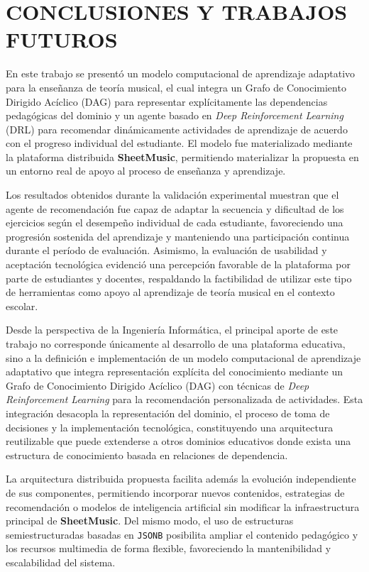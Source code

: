 \documentclass[conference]{IEEEtran}
\begin{document}
\section{CONCLUSIONES Y TRABAJOS FUTUROS}

En este trabajo se presentó un modelo computacional de aprendizaje adaptativo para la enseñanza de teoría musical, el cual integra un Grafo de Conocimiento Dirigido Acíclico (DAG) para representar explícitamente las dependencias pedagógicas del dominio y un agente basado en \textit{Deep Reinforcement Learning} (DRL) para recomendar dinámicamente actividades de aprendizaje de acuerdo con el progreso individual del estudiante. El modelo fue materializado mediante la plataforma distribuida \textbf{SheetMusic}, permitiendo materializar la propuesta en un entorno real de apoyo al proceso de enseñanza y aprendizaje.

Los resultados obtenidos durante la validación experimental muestran que el agente de recomendación fue capaz de adaptar la secuencia y dificultad de los ejercicios según el desempeño individual de cada estudiante, favoreciendo una progresión sostenida del aprendizaje y manteniendo una participación continua durante el período de evaluación. Asimismo, la evaluación de usabilidad y aceptación tecnológica evidenció una percepción favorable de la plataforma por parte de estudiantes y docentes, respaldando la factibilidad de utilizar este tipo de herramientas como apoyo al aprendizaje de teoría musical en el contexto escolar.

Desde la perspectiva de la Ingeniería Informática, el principal aporte de este trabajo no corresponde únicamente al desarrollo de una plataforma educativa, sino a la definición e implementación de un modelo computacional de aprendizaje adaptativo que integra representación explícita del conocimiento mediante un Grafo de Conocimiento Dirigido Acíclico (DAG) con técnicas de \textit{Deep Reinforcement Learning} para la recomendación personalizada de actividades. Esta integración desacopla la representación del dominio, el proceso de toma de decisiones y la implementación tecnológica, constituyendo una arquitectura reutilizable que puede extenderse a otros dominios educativos donde exista una estructura de conocimiento basada en relaciones de dependencia.

La arquitectura distribuida propuesta facilita además la evolución independiente de sus componentes, permitiendo incorporar nuevos contenidos, estrategias de recomendación o modelos de inteligencia artificial sin modificar la infraestructura principal de \textbf{SheetMusic}. Del mismo modo, el uso de estructuras semiestructuradas basadas en \texttt{JSONB} posibilita ampliar el contenido pedagógico y los recursos multimedia de forma flexible, favoreciendo la mantenibilidad y escalabilidad del sistema.
\end{document}
